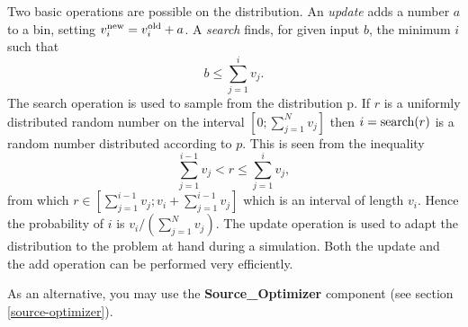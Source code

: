 Two basic operations are possible on the distribution. An \emph{update}
adds a number $a$ to a bin, setting $v_i^{\rm new} = v_i^{\rm old} +
a$. A \emph{search} finds, for given input $b$, the minimum $i$ such
that
\begin{equation}
 b \leq \sum_{j=1}^{i} v_j.
\end{equation}
The search operation is used to sample from the distribution p. If $r$
is a uniformly distributed random number on the interval
$[0;\sum_{j=1}^N v_j]$ then $i = {\rm search}(r)$ is a random number
distributed according to $p$. This is seen from the inequality
\begin{equation}
\sum_{j=1}^{i-1} v_j < r \leq \sum_{j=1}^{i} v_j,
\end{equation}
from which $r \in [\sum_{j=1}^{i-1} v_j; v_i + \sum_{j=1}^{i-1} v_j]$
which is an interval of length $v_i$. Hence the probability of $i$ is
$v_i/(\sum_{j=1}^N v_j)$.
The update operation is used to
adapt the distribution to the problem at hand during a simulation. Both
the update and the add operation can be performed very efficiently.

As an alternative, you may use the {\bf Source\_Optimizer} component
(see section \ref{source-optimizer}).
